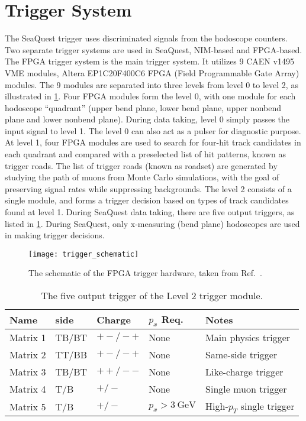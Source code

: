 \documentclass[../main.tex]{subfiles}
\begin{document}
\section{Trigger System}
The SeaQuest trigger uses discriminated signals from the hodoscope counters.
Two separate trigger systems are used in SeaQuest, NIM-based and FPGA-based.
The FPGA trigger system is the main trigger system. It utilizes 9 CAEN
v1495 VME modules, Altera EP1C20F400C6 FPGA (Field Programmable Gate Array)
modules. The 9 modules are separated into three levels from level 0 to level
2, as illustrated in \cref{fig:trigger}.
Four FPGA modules form the level 0, with one module for each hodoscope
``quadrant'' (upper bend plane, lower bend plane, upper nonbend plane and
lower nonbend plane). During data taking, level 0 simply passes the input signal
to level 1. The level 0 can also act as a pulser for diagnostic purpose.
At level 1, four FPGA modules are used to search for four-hit track
candidates in each quadrant and compared with a preselected list of hit
patterns, known as trigger roads. The list of trigger roads (known as roadset)
are generated by studying the path of muons from Monte Carlo simulations, with
the goal of preserving signal rates while suppressing backgrounds.
The level 2 consists of a single module, and forms
a trigger decision based on types of track candidates found at level 1. During
SeaQuest data taking, there are five output triggers, as listed in \cref{tab:FPGA}.
During SeaQuest, only x-measuring (bend plane) hodoscopes are used in making
trigger decisions.
\begin{figure}
	\centering
	\texttt{[image: trigger\_schematic]}
	\caption{The schematic of the FPGA trigger hardware, taken from Ref.~\cite{aidala2019}.}
	\label{fig:trigger}
\end{figure}
\begin{table}[h!]
	\centering
	\caption{The five output trigger of the Level 2 trigger module.}
	\label{tab:FPGA}
	\begin{tabular}{lllll}
		Name     & side  & Charge  & $p_x$ Req.         & Notes                     \\ \hline
		Matrix 1 & TB/BT & $+-/-+$ & None               & Main physics trigger      \\
		Matrix 2 & TT/BB & $+-/-+$ & None               & Same-side trigger         \\
		Matrix 3 & TB/BT & $++/--$ & None               & Like-charge trigger       \\
		Matrix 4 & T/B   & $+/-$   & None               & Single muon trigger       \\
		Matrix 5 & T/B   & $+/-$   & $p_x>\SI{3}{\GeV}$ & High-$p_T$ single trigger \\ \hline
	\end{tabular}
\end{table}
\end{document}

